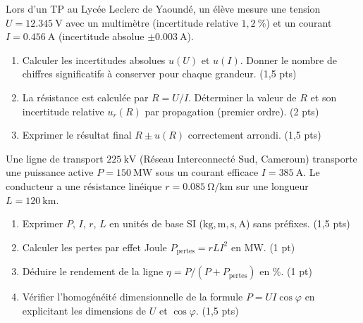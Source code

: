 \documentclass[11pt]{article}
\begin{document}
\begin{exercice}
Lors d'un TP au Lycée Leclerc de Yaoundé, un élève mesure une tension $U = \SI{12,345}{\volt}$ avec un multimètre (incertitude relative $1,2~\%$) et un courant $I = \SI{0,456}{\ampere}$ (incertitude absolue $\pm \SI{0,003}{\ampere}$).
\begin{enumerate}
    \item Calculer les incertitudes absolues $u(U)$ et $u(I)$. Donner le nombre de chiffres significatifs à conserver pour chaque grandeur. (1,5 pts)
    \item La résistance est calculée par $R = U/I$. Déterminer la valeur de $R$ et son incertitude relative $u_r(R)$ par propagation (premier ordre). (2 pts)
    \item Exprimer le résultat final $R \pm u(R)$ correctement arrondi. (1,5 pts)
\end{enumerate}
\end{exercice}

\begin{exercice}
Une ligne de transport $225~\text{kV}$ (Réseau Interconnecté Sud, Cameroun) transporte une puissance active $P = \SI{150}{\mega\watt}$ sous un courant efficace $I = \SI{385}{\ampere}$. Le conducteur a une résistance linéique $r = \SI{0,085}{\ohm\per\kilo\meter}$ sur une longueur $L = \SI{120}{\kilo\meter}$.
\begin{enumerate}
    \item Exprimer $P$, $I$, $r$, $L$ en unités de base SI ($\text{kg}, \text{m}, \text{s}, \text{A}$) sans préfixes. (1,5 pts)
    \item Calculer les pertes par effet Joule $P_{\text{pertes}} = r L I^2$ en $\text{MW}$. (1 pt)
    \item Déduire le rendement de la ligne $\eta = P / (P + P_{\text{pertes}})$ en $\%$. (1 pt)
    \item Vérifier l'homogénéité dimensionnelle de la formule $P = U I \cos\varphi$ en explicitant les dimensions de $U$ et $\cos\varphi$. (1,5 pts)
\end{enumerate}
\end{exercice}
\end{document}
